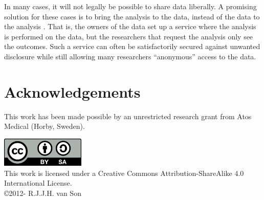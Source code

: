 \documentclass[10pt, a4paper]{article}
\newcommand{\YEAR}{\the\year}
\begin{document}
In many cases, it will not legally be possible to share data liberally. A promising solution for these cases is to bring the analysis to the data, instead of the data to the analysis \cite{SIMELL201998}. That is, the owners of the data set up a service where the analysis is performed on the data, but the researchers that request the analysis only see the outcomes. Such a service can often be satisfactorily secured against unwanted disclosure while still allowing many researchers ``anonymous'' access to the data.

\section{Acknowledgements}

This work has been made possible by an unrestricted research grant from Atos Medical (Horby, Sweden).


 

\vskip 3cm
\begin{center}
\includegraphics[width=0.3\textwidth]{Pictures/CC-share-alike}\\
This work is licensed under a Creative Commons Attribution-ShareAlike 4.0 International License.\\
\copyright 2012-{\YEAR}  R.J.J.H. van Son
\end{center}
\end{document}
